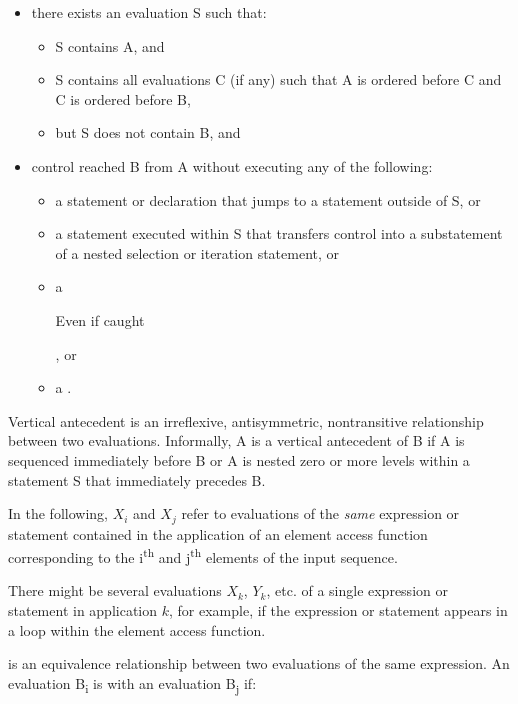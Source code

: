 \begin{itemize}
\item there exists an evaluation S such that:
  \begin{itemize}
    \item S contains A, and
    \item S contains all evaluations C (if any) such that A is ordered before C and C is ordered before B,
    \item but S does not contain B, and
  \end{itemize}
\item control reached B from A without executing any of the following:
  \begin{itemize}
    \item a  statement or  declaration that jumps to a statement outside of S, or
    \item a  statement executed within S that transfers control into a substatement of a nested selection or iteration statement, or
    \item a  \begin{note}Even if caught\end{note}, or
    \item a .
  \end{itemize}
\end{itemize}

\begin{note}
Vertical antecedent is an irreflexive, antisymmetric, nontransitive relationship between two evaluations. Informally, A is a vertical antecedent of B if A is sequenced immediately before B or A is nested zero or more levels within a statement S that immediately precedes B.
\end{note}

\pnum
In the following, $X_i$ and $X_j$ refer to evaluations of the {\em same} expression
or statement contained in the application of an element access function
corresponding to the i\textsuperscript{th} and j\textsuperscript{th} elements of the input sequence.
\begin{note}There might be several evaluations $X_k$, $Y_k$, etc. of a single
expression or statement in application $k$, for example, if the expression or
statement appears in a loop within the element access function.\end{note}

\pnum
{} is an equivalence relationship between two
evaluations of the same expression. An evaluation B\textsubscript{i} is
 with an evaluation B\textsubscript{j} if:

